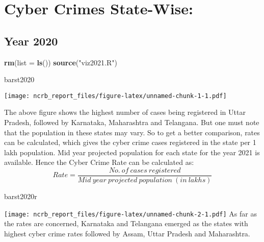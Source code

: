 \documentclass[
  12,
  a4paper,
]{report}
\newenvironment{Shaded}{\begin{snugshade}}{\end{snugshade}}
\newcommand{\AttributeTok}[1]{\textcolor[rgb]{0.13,0.29,0.53}{#1}}
\newcommand{\DecValTok}[1]{\textcolor[rgb]{0.00,0.00,0.81}{#1}}
\newcommand{\FunctionTok}[1]{\textcolor[rgb]{0.13,0.29,0.53}{\textbf{#1}}}
\newcommand{\NormalTok}[1]{#1}
\newcommand{\OtherTok}[1]{\textcolor[rgb]{0.56,0.35,0.01}{#1}}
\newcommand{\SpecialCharTok}[1]{\textcolor[rgb]{0.81,0.36,0.00}{\textbf{#1}}}
\newcommand{\StringTok}[1]{\textcolor[rgb]{0.31,0.60,0.02}{#1}}
\begin{document}
\hypertarget{cyber-crimes-state-wise}{%
\section{Cyber Crimes State-Wise:}\label{cyber-crimes-state-wise}}

\hypertarget{year-2020}{%
\subsection{Year 2020}\label{year-2020}}

\begin{Shaded}
\begin{Highlighting}[]
\FunctionTok{rm}\NormalTok{(}\AttributeTok{list =} \FunctionTok{ls}\NormalTok{())}
\FunctionTok{source}\NormalTok{(}\StringTok{"viz2021.R"}\NormalTok{)}

\NormalTok{barst2020}
\end{Highlighting}
\end{Shaded}

\texttt{[image: ncrb\_report\_files/figure-latex/unnamed-chunk-1-1.pdf]}

The above figure shows the highest number of cases being registered in
Uttar Pradesh, followed by Karnataka, Maharashtra and Telangana. But one
must note that the population in these states may vary. So to get a
better comparison, rates can be calculated, which gives the cyber crime
cases registered in the state per 1 lakh population. Mid year projected
population for each state for the year 2021 is available. Hence the
Cyber Crime Rate can be calculated as:\\
\[Rate = \frac{No. \ of \ cases \ registered }{Mid \ year \ projected \ population \ (in \ lakhs)}\]

\begin{Shaded}
\begin{Highlighting}[]
\NormalTok{barst2020r}
\end{Highlighting}
\end{Shaded}

\texttt{[image: ncrb\_report\_files/figure-latex/unnamed-chunk-2-1.pdf]}
As far as the rates are concerned, Karnataka and Telangana emerged as
the states with highest cyber crime rates followed by Assam, Uttar
Pradesh and Maharashtra.

\begin{Shaded}
\end{Shaded}
\end{document}
